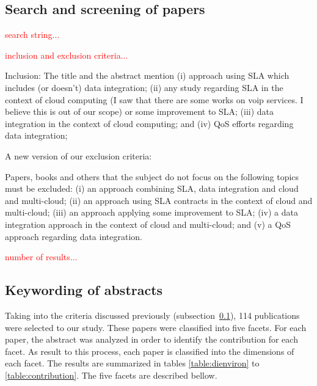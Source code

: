 \subsection{Search and screening of papers} \label{subsec:search}
\textcolor{red}{search string...}

\textcolor{red}{inclusion and exclusion criteria...}

Inclusion: The title and the abstract mention (i) approach using SLA which includes (or doesn't) data integration; (ii) any study regarding SLA in the context of cloud computing (I saw that there are some works on voip services. I believe this is out of our scope) or some improvement to SLA; (iii) data integration in the context of cloud computing; and (iv) QoS efforts regarding data integration;

A new version of our exclusion criteria:

Papers, books and others that the subject do not focus on the following topics must be excluded:
(i) an approach combining SLA, data integration and cloud and multi-cloud;
(ii) an approach using SLA contracts in the context of cloud and multi-cloud;
(iii) an approach applying some improvement to SLA;
(iv) a data integration approach in the context of cloud and multi-cloud; and
(v) a QoS approach regarding data integration.

\textcolor{red}{number  of results...}

\subsection{Keywording of abstracts}

Taking into the criteria discussed previously (subsection~\ref{subsec:search}), 114 publications 
were selected to our study. 
These papers were classified into five facets. For each paper, the abstract was analyzed in order to
identify the contribution for each facet.
As result to this process, each paper is classified into the dimensions of each facet. 
The results are summarized in tables \ref{table:dienviron} to \ref{table:contribution}. 
The five facets are described bellow.

